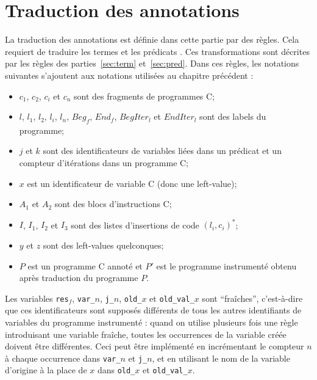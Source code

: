 \section{Traduction des annotations \eacsl}
\label{sec:annot}


La traduction des annotations est définie dans cette partie par des règles.
Cela requiert de traduire les termes et les prédicats \eacsl.
Ces transformations sont décrites par les règles des parties~\ref{sec:term}
et~\ref{sec:pred}.
Dans ces règles, les notations suivantes s'ajoutent aux notations utilisées au
chapitre précédent :
\begin{itemize}
\item $c_1$, $c_2$, $c_i$ et $c_n$ sont des fragments de programmes C;
\item $l$, $l_1$, $l_2$, $l_i$, $l_n$, $\mathit{Beg_f}$, $\mathit{End_f}$,
  $\mathit{BegIter_l}$ et $\mathit{EndIter_l}$ sont des labels du programme;
\item $j$ et $k$ sont des identificateurs de variables liées
  dans un prédicat \eacsl et un compteur d'itérations dans un programme C;
\item $x$ est un identificateur de variable C (donc une left-value);
\item $A_1$ et $A_2$ sont des blocs d'instructions C;
\item $I$, $I_1$, $I_2$ et $I_3$ sont des listes d'insertions de code
  $(l_i, c_i)^*$;
\item $y$ et $z$ sont des left-values quelconques;
\item $P$ est un programme C annoté et $P'$ est le programme instrumenté
  obtenu après traduction du programme $P$.
\end{itemize}

Les variables \lstinline'res'$_f$, \lstinline'var_'$n$,
\lstinline'j_'$n$, \lstinline'old_'$x$ et \lstinline'old_val_'$x$ sont
``fraîches'', c'est-à-dire que ces identificateurs sont supposés
différents de tous les autres identifiants de variables du programme instrumenté
: quand on utilise plusieurs fois une règle introduisant une variable fraîche,
toutes les occurrences de la variable créée doivent être différentes.
Ceci peut être implémenté en incrémentant le compteur $n$ à chaque
occurrence dans \lstinline'var_'$n$ et \lstinline'j_'$n$, et en utilisant le nom
de la variable d'origine à la place de $x$ dans \lstinline'old_'$x$ et
\lstinline'old_val_'$x$.

